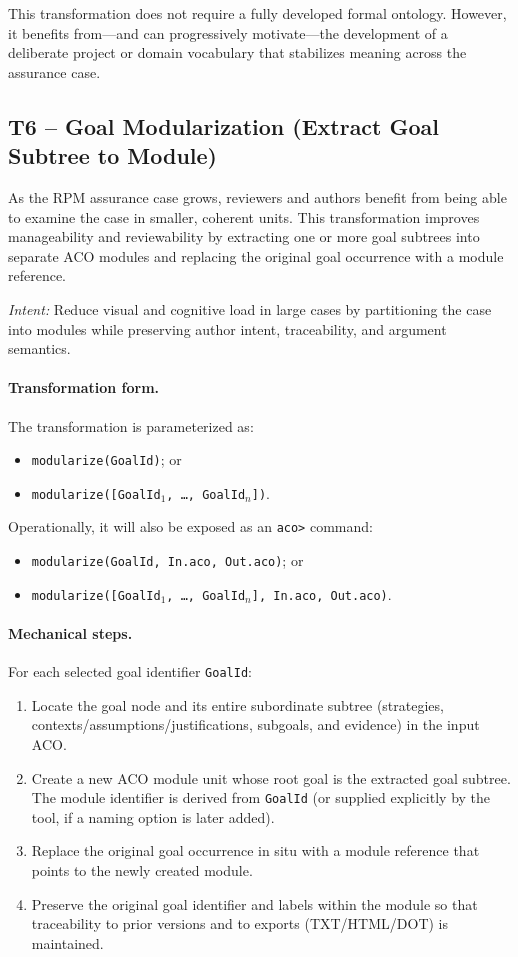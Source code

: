 \documentclass{article}
\begin{document}
This transformation does not require a fully developed formal ontology. However, it benefits from---and can progressively motivate---the development of a deliberate project or domain vocabulary that stabilizes meaning across the assurance case.

\subsection{T6 -- Goal Modularization (Extract Goal Subtree to Module)}
\label{sec:t6}

As the RPM assurance case grows, reviewers and authors benefit from being able to examine the case in smaller, coherent units.
This transformation improves manageability and reviewability by extracting one or more goal subtrees into separate ACO modules and replacing the original goal occurrence with a module reference.

\emph{Intent:} Reduce visual and cognitive load in large cases by partitioning the case into modules while preserving author intent, traceability, and argument semantics.

\paragraph{Transformation form.}
The transformation is parameterized as:
\begin{itemize}
  \item \texttt{modularize(GoalId)}; or
  \item \texttt{modularize([GoalId$_1$, \ldots, GoalId$_n$])}.
\end{itemize}
Operationally, it will also be exposed as an \texttt{aco>} command:
\begin{itemize}
  \item \texttt{modularize(GoalId, In.aco, Out.aco)}; or
  \item \texttt{modularize([GoalId$_1$, \ldots, GoalId$_n$], In.aco, Out.aco)}.
\end{itemize}

\paragraph{Mechanical steps.}
For each selected goal identifier \texttt{GoalId}:
\begin{enumerate}
  \item Locate the goal node and its entire subordinate subtree (strategies, contexts/assumptions/justifications, subgoals, and evidence) in the input ACO.
  \item Create a new ACO module unit whose root goal is the extracted goal subtree. The module identifier is derived from \texttt{GoalId} (or supplied explicitly by the tool, if a naming option is later added).
  \item Replace the original goal occurrence in situ with a module reference that points to the newly created module.
  \item Preserve the original goal identifier and labels within the module so that traceability to prior versions and to exports (TXT/HTML/DOT) is maintained.
\end{enumerate}
\end{document}

